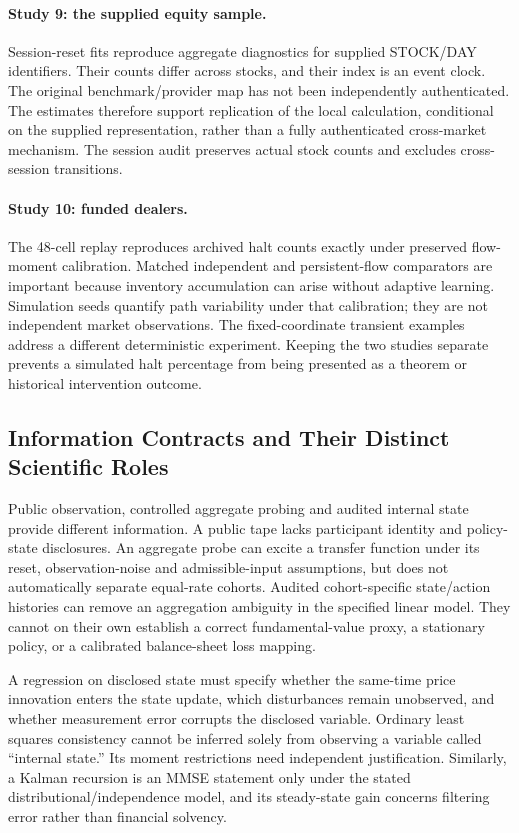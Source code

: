 \paragraph{Study 9: the supplied equity sample.}
Session-reset fits reproduce aggregate diagnostics for supplied STOCK/DAY identifiers. Their counts differ across stocks, and their index is an event clock. The original benchmark/provider map has not been independently authenticated. The estimates therefore support replication of the local calculation, conditional on the supplied representation, rather than a fully authenticated cross-market mechanism. The session audit preserves actual stock counts and excludes cross-session transitions.

\paragraph{Study 10: funded dealers.}
The 48-cell replay reproduces archived halt counts exactly under preserved flow-moment calibration. Matched independent and persistent-flow comparators are important because inventory accumulation can arise without adaptive learning. Simulation seeds quantify path variability under that calibration; they are not independent market observations. The fixed-coordinate transient examples address a different deterministic experiment. Keeping the two studies separate prevents a simulated halt percentage from being presented as a theorem or historical intervention outcome.

\subsection{Information Contracts and Their Distinct Scientific Roles}
Public observation, controlled aggregate probing and audited internal state provide different information. A public tape lacks participant identity and policy-state disclosures. An aggregate probe can excite a transfer function under its reset, observation-noise and admissible-input assumptions, but does not automatically separate equal-rate cohorts. Audited cohort-specific state/action histories can remove an aggregation ambiguity in the specified linear model. They cannot on their own establish a correct fundamental-value proxy, a stationary policy, or a calibrated balance-sheet loss mapping.

A regression on disclosed state must specify whether the same-time price innovation enters the state update, which disturbances remain unobserved, and whether measurement error corrupts the disclosed variable. Ordinary least squares consistency cannot be inferred solely from observing a variable called ``internal state.'' Its moment restrictions need independent justification. Similarly, a Kalman recursion is an MMSE statement only under the stated distributional/independence model, and its steady-state gain concerns filtering error rather than financial solvency.

